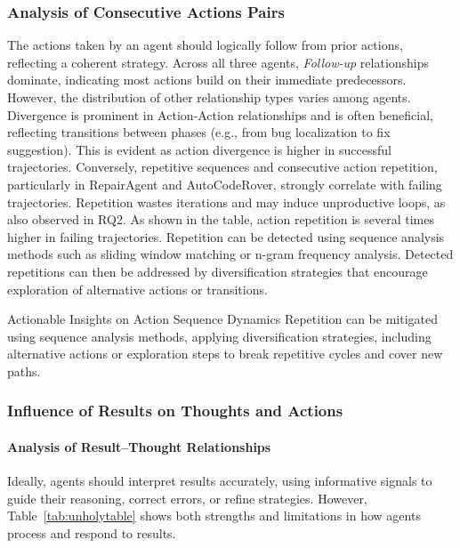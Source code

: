 \documentclass[conference,10pt]{IEEEtran}
\theoremstyle{definition}        %
\newcommand{\ra}{Repair\-Agent}
\newcommand{\acr}{Auto\-Code\-Rover}
\begin{document}
\subsubsection{\textbf{Analysis of Consecutive Actions Pairs}}




The actions taken by an agent should logically follow from prior actions, reflecting a coherent strategy.
Across all three agents, \emph{Follow-up} relationships dominate, indicating most actions build on their immediate predecessors.
However, the distribution of other relationship types varies among agents.
Divergence is prominent in Action-Action relationships and is often beneficial, reflecting transitions between phases (e.g., from bug localization to fix suggestion).
This is evident as action divergence is higher in successful trajectories.
Conversely, repetitive sequences and consecutive action repetition, particularly in \ra{} and \acr{}, strongly correlate with failing trajectories.
Repetition wastes iterations and may induce unproductive loops, as also observed in RQ2. As shown in the table, action repetition is several times higher in failing trajectories.
Repetition can be detected using sequence analysis methods such as sliding window matching or n-gram frequency analysis.
Detected repetitions can then be addressed by diversification strategies that encourage exploration of alternative actions or transitions.

\begin{findingsbox}{Actionable Insights on Action Sequence Dynamics}
Repetition can be mitigated using sequence analysis methods, 
applying diversification strategies, including alternative actions or exploration steps to break repetitive cycles and cover new paths.
\end{findingsbox}





\subsubsection{\textbf{Influence of Results on Thoughts and Actions}}
\paragraph{Analysis of Result–Thought Relationships}
Ideally, agents should interpret results accurately, using informative signals to guide their reasoning, correct errors, or refine strategies.
However, Table~\ref{tab:unholytable} shows both strengths and limitations in how agents process and respond to results.
\end{document}
